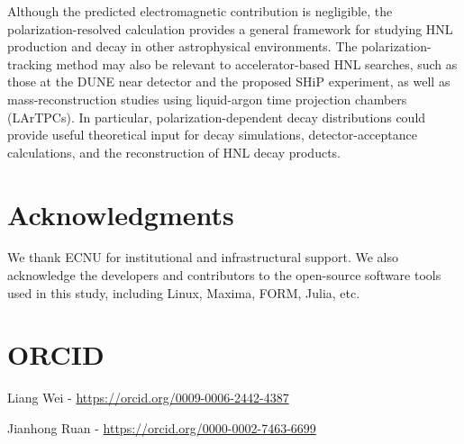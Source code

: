 \documentclass{ws-ijmpa}
\begin{document}
Although the predicted electromagnetic contribution is negligible, 
the polarization-resolved calculation provides a general framework 
for studying HNL production and decay in other astrophysical environments. 
The polarization-tracking method may also be relevant to accelerator-based 
HNL searches, such as those at the DUNE near detector and the proposed SHiP 
experiment,\cite{Ballett_2020,shipcollaboration2019sensitivityshipexperimentheavy} 
as well as mass-reconstruction studies using liquid-argon time projection chambers 
(LArTPCs).\cite{Alves_2025} In particular, polarization-dependent decay 
distributions could provide useful theoretical input for decay simulations, 
detector-acceptance calculations, and the reconstruction of HNL decay products.

\section*{Acknowledgments}

We thank ECNU for institutional and infrastructural support.
We also acknowledge the developers and contributors to the 
open-source software tools used in this study,
including Linux, Maxima, FORM, Julia, etc.

\section*{ORCID}

\noindent Liang Wei - \url{https://orcid.org/0009-0006-2442-4387}

\noindent Jianhong Ruan - \url{https://orcid.org/0000-0002-7463-6699}



\end{document}
